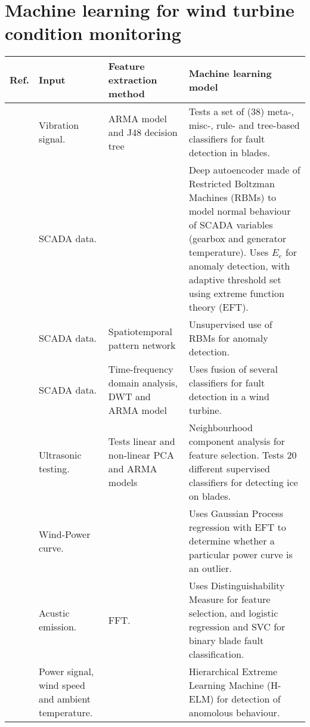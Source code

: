 \section{Machine learning for wind turbine condition monitoring}

\begin{longtable}{p{}p{}p{}p{}}
    \hline
    Ref. & Input & Feature extraction method & Machine learning model \\
    \hline \hline
    \cite{ml_cm_wt_blade_ARMA_2018} & Vibration signal. & ARMA model and J48 decision tree & Tests a set of (38) meta-, misc-, rule- and tree-based classifiers for fault detection in blades. \\  \hline
    \cite{AD_and_fault_analysis_wt_DAE} & SCADA data. & & Deep autoencoder made of Restricted Boltzman Machines (RBMs) to model normal behaviour of SCADA variables (gearbox and generator temperature). Uses $E_e$ for anomaly detection, with adaptive threshold set using extreme function theory (EFT). \\ \hline
    \cite{unsup_graphical_modeling_wt_cm} & SCADA data. & Spatiotemporal pattern network & Unsupervised use of RBMs for anomaly detection. \\ \hline
    \cite{fault_detection_and_isolation_using_classifier_fusion} & SCADA data. & Time-frequency domain analysis, DWT and ARMA model & Uses fusion of several classifiers for fault detection in a wind turbine.  \\ \hline
    \cite{lin_and_non_lin_feat_for_ice_detection_on_blades} & Ultrasonic testing. & Tests linear and non-linear PCA and ARMA models & Neighbourhood component analysis for feature selection. Tests 20 different supervised classifiers for detecting ice on blades. \\ \hline
    \cite{perf_mon_of_wt_using_extreme_func_theory} & Wind-Power curve. &  & Uses Gaussian Process regression with EFT to determine whether a particular power curve is an outlier.\\ \hline
    \cite{blade_damage_detection_sup_ml_alg} & Acustic emission. & FFT. & Uses Distinguishability Measure for feature selection, and logistic regression and SVC for binary blade fault classification. \\ \hline
    \cite{wt_cm_using_cloud_computing_and_HELM} & Power signal, wind speed and ambient temperature. & & Hierarchical Extreme Learning Machine (H-ELM) for detection of anomolous behaviour. \\ \hline

\end{longtable}
